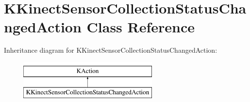 \hypertarget{class_k_kinect_sensor_collection_status_changed_action}{\section{\-K\-Kinect\-Sensor\-Collection\-Status\-Changed\-Action \-Class \-Reference}
\label{class_k_kinect_sensor_collection_status_changed_action}
}
\-Inheritance diagram for \-K\-Kinect\-Sensor\-Collection\-Status\-Changed\-Action\-:\begin{figure}[H]
\begin{center}
\leavevmode
\includegraphics[height=2.000000cm]{class_k_kinect_sensor_collection_status_changed_action}
\end{center}
\end{figure}
